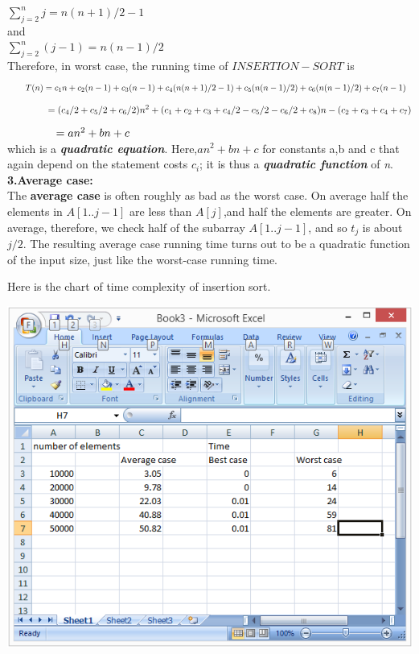 \documentclass[9 pt]{report}
\begin{document}
$\sum_{j=2}^nj=n(n+1)/2-1$\\

and\\

$\sum_{j=2}^n(j-1)=n(n-1)/2$\\

Therefore, in worst case, the running time of $INSERTION-SORT$ is\\
$$\hspace{0.5cm}T(n)=c_1n+c_2(n-1)+c_3(n-1)+c_4(n(n+1)/2-1)+c_5(n(n-1)/2)+ c_6(n(n-1)/2)+c_7(n-1)$$
$$\hspace{1.5cm}=(c_4/2+c_5/2+c_6/2)n^2+(c_1+c_2+c_3+c_4/2-c_5/2-c_6/2+c_8)n-(c_2+c_3+c_4+c_7)$$
$\hspace{1.5cm}=an^2+bn+c$\\

which is a \textbf{\textit{ quadratic equation}}. Here,$an^2+bn+c$ for constants a,b and c that again depend on the statement costs $c_i$; it is thus a \textbf{\textit{quadratic function}} of \textit{n}.\\



\textbf{3.Average  case:}\\

The \textbf{average case} is often roughly as bad as the worst case. On average half the elements in $A[1..j-1]$ are less than $A[j]$,and half the elements are greater. On average, therefore, we check half of the subarray $A[1..j-1]$, and so $t_j$ is about $j/2$. The resulting average case running time turns out to be a quadratic function of the input size, just like the worst-case running time.

Here is the chart of time complexity of insertion sort.

\vspace{1cm}

\includegraphics{insertdata.png}
\end{document}
